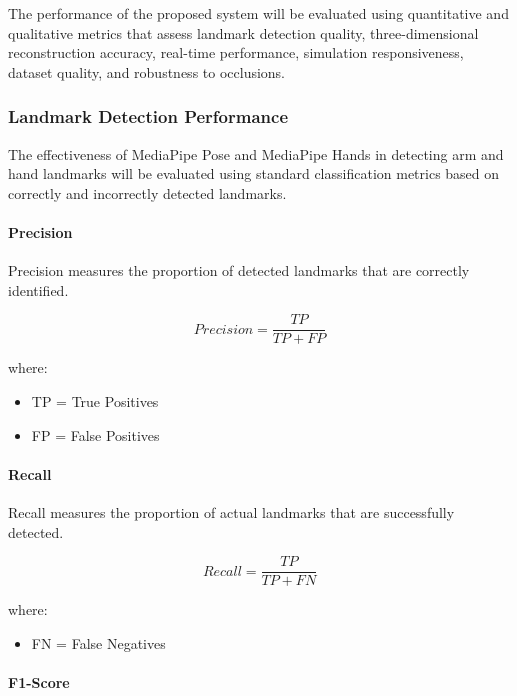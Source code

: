 The performance of the proposed system will be evaluated using quantitative and qualitative metrics that assess landmark detection quality, three-dimensional reconstruction accuracy, real-time performance, simulation responsiveness, dataset quality, and robustness to occlusions.

\subsubsection{Landmark Detection Performance}

The effectiveness of MediaPipe Pose and MediaPipe Hands in detecting arm and hand landmarks will be evaluated using standard classification metrics based on correctly and incorrectly detected landmarks.

\paragraph{Precision}

Precision measures the proportion of detected landmarks that are correctly identified.

\begin{equation}
Precision = \frac{TP}{TP+FP}
\end{equation}

where:
\begin{itemize}
    \item TP = True Positives
    \item FP = False Positives
\end{itemize}

\paragraph{Recall}

Recall measures the proportion of actual landmarks that are successfully detected.

\begin{equation}
Recall = \frac{TP}{TP+FN}
\end{equation}

where:
\begin{itemize}
    \item FN = False Negatives
\end{itemize}

\paragraph{F1-Score}

